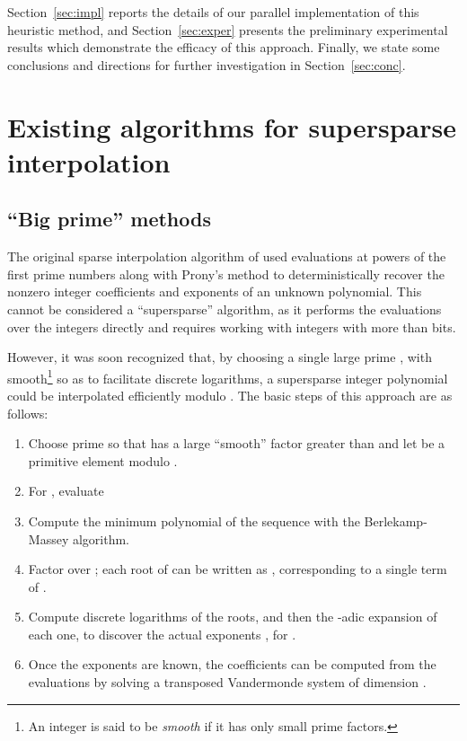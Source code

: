 \documentclass[letterpaper,10pt]{article}
\def\cite{\citep}
\begin{document}
Section~\ref{sec:impl} reports the details of our parallel
implementation of this heuristic method, and Section~\ref{sec:exper}
presents the preliminary experimental results which demonstrate the
efficacy of this approach. Finally, we state some conclusions and directions for
further investigation in Section~\ref{sec:conc}.

\section{Existing algorithms for supersparse interpolation}
\label{sec:exist}

\subsection{``Big prime'' methods}

The original sparse interpolation 
algorithm of \cite{BT88} used evaluations at powers of the first 
prime numbers along with Prony's method to deterministically recover the
nonzero integer coefficients and exponents of an unknown polynomial.
This cannot be considered a ``supersparse'' algorithm, as it
performs the evaluations over the integers directly and
requires working with integers with more than  bits.

However, it was soon recognized that, by choosing a single large prime
, with  smooth\footnote{
  An integer is said to be \emph{smooth} if it has only small prime
  factors.
} so as to facilitate discrete logarithms,
a supersparse integer polynomial could be interpolated efficiently
modulo  \cite{KLW90,Kal10a}. The basic steps of this approach are as
follows:

\begin{enumerate}
  \item Choose prime  so that  has a large ``smooth''
    factor greater than  and let  be a primitive element
    modulo .
  \item For , evaluate
    
  \item Compute the minimum polynomial  of the 
    sequence  with the Berlekamp-Massey algorithm.
  \item Factor  over ; each root of  can be
    written as
    , corresponding to
    a single term  of .
  \item Compute  discrete logarithms of the roots, and then the
    -adic expansion of each one, to discover the actual exponents
    , for .
  \item Once the exponents are known, the coefficients can be computed
    from the evaluations  by solving a transposed
    Vandermonde system of dimension .
\end{enumerate}
\end{document}
